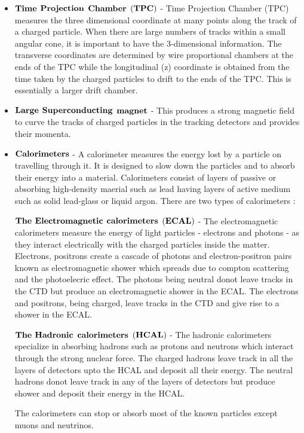 \begin{itemize}
\item
$\bf{Time}$ $\bf{Projection}$ $\bf{Chamber}$  $\bf{(TPC)}$ - Time Projection Chamber (TPC) measures the three dimensional coordinate at many points along the track of a charged particle. When there are large numbers of tracks within a small angular cone, it is important to have the 3-dimensional information. The transverse coordinates are determined by wire proportional chambers at the ends of the TPC while the longitudinal (z) coordinate is obtained from the time taken by the charged particles to drift to the ends of the TPC. This is essentially a larger drift chamber.

\item 
$\bf{Large}$ $\bf{Superconducting}$ $\bf{magnet}$  - This produces a strong magnetic field to curve the tracks of charged particles in the tracking detectors and provides their momenta.

\item 
$\bf{Calorimeters}$ - A calorimeter measures the energy lost by a particle on travelling through it. It is designed to slow down the particles and to absorb their energy into a material. Calorimeters consist of layers of passive or absorbing high-density maerial such as lead having layers of active medium such as solid lead-glass or liquid argon. 
There are two types of calorimeters : 

$\bf{The}$ $\bf{Electromagnetic}$ $\bf{calorimeters}$ $\bf{(ECAL)}$ - The electromagnetic calorimeters measure the energy of light particles - electrons and photons - as they interact electrically with the charged particles inside the matter. Electrons, positrons create a cascade of photons and electron-positron pairs known as electromagnetic shower which spreads due to compton scattering and the photoelecric effect. The photons being neutral donot leave tracks in the CTD but produce an electromagnetic shower in the ECAL. The electrons and positrons, being charged, leave tracks in the CTD and give rise to a shower in the ECAL. 


$\bf{The}$ $\bf{Hadronic}$ $\bf{calorimeters}$ $\bf{(HCAL)}$ - The hadronic calorimeters specialize in absorbing hadrons such as protons and neutrons which interact through the strong nuclear force. The charged hadrons leave track in all the layers of detectors upto the HCAL and deposit all their energy. The neutral hadrons donot leave track in any of the layers of detectors but produce shower and deposit their energy in the HCAL. 

The calorimeters can stop or absorb most of the known particles except muons and neutrinos.


\end{itemize}
